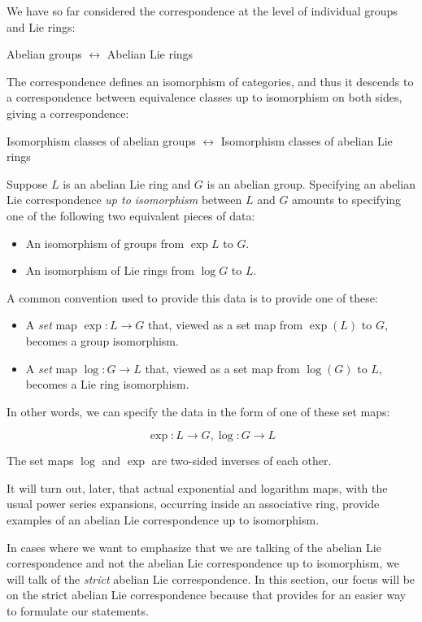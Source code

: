 \documentclass{ucetd}
\begin{document}
We have so far considered the correspondence at the level of
individual groups and Lie rings:

\begin{center}
  Abelian groups $\leftrightarrow$ Abelian Lie rings
\end{center}

The correspondence defines an isomorphism of categories, and thus it
descends to a correspondence between equivalence classes up to
isomorphism on both sides, giving a correspondence:

\begin{center}
  Isomorphism classes of abelian groups $\leftrightarrow$ Isomorphism classes of abelian Lie rings
\end{center}

Suppose $L$ is an abelian Lie ring and $G$ is an abelian
group. Specifying an abelian Lie correspondence {\em up to
  isomorphism} between $L$ and $G$ amounts to specifying one of the
following two equivalent pieces of data:

\begin{itemize}
\item An isomorphism of groups from $\exp L$ to $G$.
\item An isomorphism of Lie rings from $\log G$ to $L$.
\end{itemize}

A common convention used to provide this data is to provide one of these:

\begin{itemize}
\item A {\em set} map $\exp:L \to G$ that, viewed as a set map from
  $\exp(L)$ to $G$, becomes a group isomorphism.
\item A {\em set} map $\log:G \to L$ that, viewed as a set map from
  $\log(G)$ to $L$, becomes a Lie ring isomorphism.
\end{itemize}

In other words, we can specify the data in the form of one of these set maps:

$$\exp: L \to G, \log: G \to L$$

The set maps $\log$ and $\exp$ are two-sided inverses of each other.

It will turn out, later, that actual exponential and logarithm maps,
with the usual power series expansions, occurring inside an
associative ring, provide examples of an abelian Lie correspondence up
to isomorphism.

In cases where we want to emphasize that we are talking of the abelian
Lie correspondence and not the abelian Lie correspondence up to
isomorphism, we will talk of the {\em strict} abelian Lie
correspondence. In this section, our focus will be on the strict
abelian Lie correspondence because that provides for an easier way to
formulate our statements.
\end{document}
